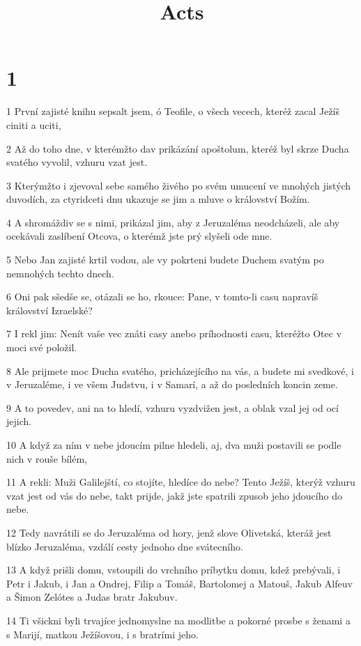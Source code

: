 

\title{Acts}

\chapter{1}

\par 1 První zajisté knihu sepsalt jsem, ó Teofile, o všech vecech, kteréž zacal Ježíš ciniti a uciti,
\par 2 Až do toho dne, v kterémžto dav prikázání apoštolum, kteréž byl skrze Ducha svatého vyvolil, vzhuru vzat jest.
\par 3 Kterýmžto i zjevoval sebe samého živého po svém umucení ve mnohých jistých duvodích, za ctyridceti dnu ukazuje se jim a mluve o království Božím.
\par 4 A shromáždiv se s nimi, prikázal jim, aby z Jeruzaléma neodcházeli, ale aby ocekávali zaslíbení Otcova, o kterémž jste prý slyšeli ode mne.
\par 5 Nebo Jan zajisté krtil vodou, ale vy pokrteni budete Duchem svatým po nemnohých techto dnech.
\par 6 Oni pak sšedše se, otázali se ho, rkouce: Pane, v tomto-li casu napravíš království Izraelské?
\par 7 I rekl jim: Nenít vaše vec znáti casy anebo príhodnosti casu, kteréžto Otec v moci své položil.
\par 8 Ale prijmete moc Ducha svatého, pricházejícího na vás, a budete mi svedkové, i v Jeruzaléme, i ve všem Judstvu, i v Samarí, a až do posledních koncin zeme.
\par 9 A to povedev, ani na to hledí, vzhuru vyzdvižen jest, a oblak vzal jej od ocí jejich.
\par 10 A když za ním v nebe jdoucím pilne hledeli, aj, dva muži postavili se podle nich v rouše bílém,
\par 11 A rekli: Muži Galilejští, co stojíte, hledíce do nebe? Tento Ježíš, kterýž vzhuru vzat jest od vás do nebe, takt prijde, jakž jste spatrili zpusob jeho jdoucího do nebe.
\par 12 Tedy navrátili se do Jeruzaléma od hory, jenž slove Olivetská, kteráž jest blízko Jeruzaléma, vzdálí cesty jednoho dne svátecního.
\par 13 A když prišli domu, vstoupili do vrchního príbytku domu, kdež prebývali, i Petr i Jakub, i Jan a Ondrej, Filip a Tomáš, Bartolomej a Matouš, Jakub Alfeuv a Šimon Zelótes a Judas bratr Jakubuv.
\par 14 Ti všickni byli trvajíce jednomyslne na modlitbe a pokorné prosbe s ženami a s Marijí, matkou Ježíšovou, i s bratrími jeho.
